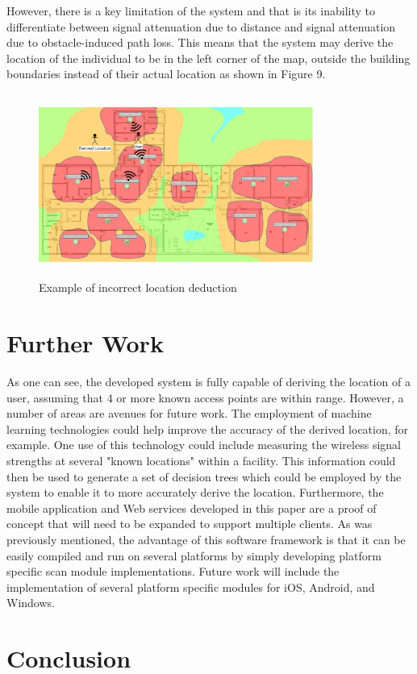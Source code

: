 \documentclass[conference]{IEEEtran}
\begin{document}
However, there is a key limitation of the system and that is its inability to differentiate between signal attenuation due to distance and signal attenuation due to obstacle-induced path loss. This means that the system may derive the location of the individual to be in the left corner of the map, outside the building boundaries instead of their actual location as shown in Figure 9.
\begin{figure}[H]
    \includegraphics[width=9.0cm,height=6cm]{Geolocation_3.jpeg}
    \caption{Example of incorrect location deduction}
    \end{figure}

\section{Further Work}
As one can see, the developed system is fully capable of deriving the location of a user, assuming that 4 or more known access points are within range. However, a number of areas are avenues for future work. The employment of machine learning technologies could help improve the accuracy of the derived location, for example. One use of this technology could include measuring the wireless signal strengths at several "known locations" within a facility. This information could then be used to generate a set of decision trees which could be employed by the system to enable it to more accurately derive the location. Furthermore, the mobile application and Web services developed in this paper are a proof of concept that will need to be expanded to support multiple clients. As was previously mentioned, the advantage of this software framework is that it can be easily compiled and run on several platforms by simply developing platform specific scan module implementations. Future work will include the implementation of several platform specific modules for iOS, Android, and Windows.

\section{Conclusion}
\end{document}
